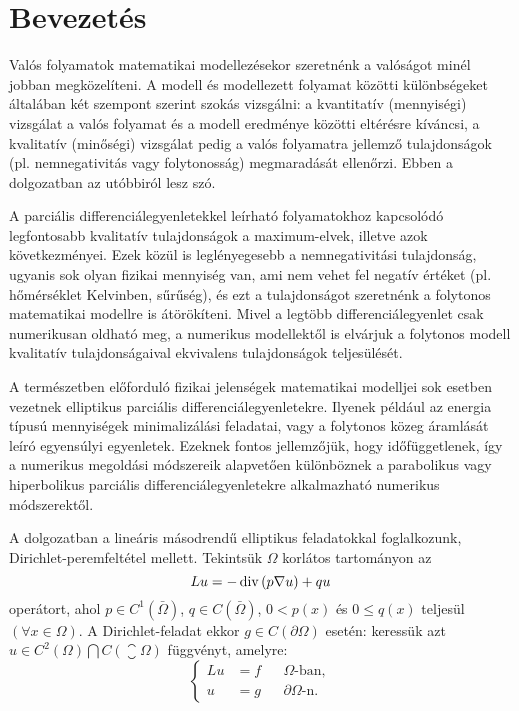\chapter*{Bevezetés}


Valós folyamatok matematikai modellezésekor szeretnénk a valóságot minél jobban megközelíteni. A modell és modellezett folyamat közötti különbségeket általában két szempont szerint szokás vizsgálni: a kvantitatív (mennyiségi) vizsgálat a valós folyamat és a modell eredménye közötti eltérésre kíváncsi, a kvalitatív (minőségi) vizsgálat pedig a valós folyamatra jellemző tulajdonságok (pl. nemnegativitás vagy folytonosság) megmaradását  ellenőrzi. Ebben a dolgozatban az utóbbiról lesz szó. 
  
A parciális differenciálegyenletekkel leírható folyamatokhoz kapcsolódó legfontosabb kvalitatív tulajdonságok a  maximum-elvek, illetve azok következményei. Ezek közül is  leglényegesebb  a nemnegativitási tulajdonság, ugyanis sok olyan fizikai mennyiség van, ami nem vehet fel negatív értéket (pl. hőmérséklet Kelvinben, sűrűség), és ezt a tulajdonságot szeretnénk a folytonos matematikai modellre is átörökíteni. Mivel a legtöbb differenciálegyenlet csak numerikusan oldható meg, a numerikus modellektől is elvárjuk a folytonos modell kvalitatív tulajdonságaival ekvivalens tulajdonságok teljesülését.

A természetben előforduló fizikai jelenségek matematikai modelljei sok esetben vezetnek elliptikus parciális differenciálegyenletekre. Ilyenek például az energia típusú mennyiségek minimalizálási feladatai, vagy a folytonos közeg áramlását leíró egyensúlyi egyenletek. Ezeknek fontos jellemzőjük, hogy időfüggetlenek, így a numerikus megoldási módszereik alapvetően különböznek a parabolikus vagy hiperbolikus parciális differenciálegyenletekre alkalmazható numerikus módszerektől.

A dolgozatban a lineáris másodrendű elliptikus feladatokkal foglalkozunk, Dirichlet-peremfeltétel mellett. Tekintsük  $\Omega$ korlátos tartományon az
\begin{equation*}
	Lu = -\operatorname{div}\left(p \nabla u \right) + q u
\end{equation*}
operátort, ahol $p \in C^1(\bar{\Omega})$, $q \in C(\bar{\Omega})$, $ 0 < p(x) $ és  $ 0 \leq q(x) $ teljesül $(\forall x \in \Omega)$. A Dirichlet-feladat ekkor $g \in C(\partial\Omega)$ esetén: keressük azt  $u \in C^2(\Omega) \bigcap C(\closure{\Omega})$ függvényt, amelyre:
\begin{equation*}	
	\left\{
	\begin{aligned}
		Lu &= f && \Omega \text{-ban}, \\
		u &= g & &\partial\Omega \text{-n}.
	\end{aligned}
	\right.
\end{equation*}



